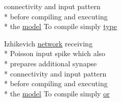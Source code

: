 \begin{DoxyCompactItemize}
connectivity and input pattern \\*
before compiling and executing \\*
the \hyperlink{README_8txt_a69fd801b7213948c12d9dd7eebb3ed14}{model} To compile simply \hyperlink{userproject_2PoissonIzh__project_2README_8txt_a18700dbf29429942d4c3eda1e02fdef7}{type}
\item 
Izhikevich \hyperlink{userproject_2Izh__sparse__project_2README_8txt_a3b32176ef4eb1068d5341ffeb475ff7d}{network} receiving \\*
Poisson input spike which also \\*
prepares additional synapse \\*
connectivity and input pattern \\*
before compiling and executing \\*
the \hyperlink{README_8txt_a69fd801b7213948c12d9dd7eebb3ed14}{model} To compile simply \hyperlink{userproject_2PoissonIzh__project_2README_8txt_ad4021097ab0ba066271614bf3f4c2e27}{or}
\end{DoxyCompactItemize}


